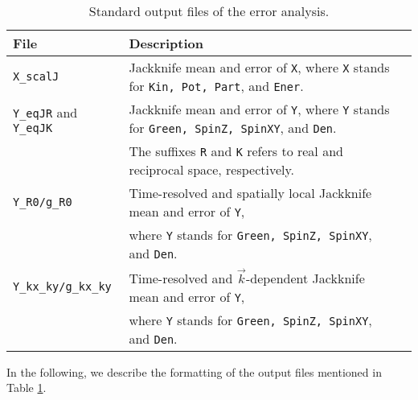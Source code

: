 %
\begin{table}[h]
   \begin{tabular}{@{} l l l @{}}\toprule
   File & Description \\\midrule
   \texttt{X\_scalJ} & Jackknife mean and error of \texttt{X}, where  \texttt{X} stands for \texttt{Kin, Pot, Part}, and \texttt{Ener}.\\
   \texttt{Y\_eqJR} and \texttt{Y\_eqJK} & Jackknife mean and error of \texttt{Y}, where \texttt{Y} stands for \texttt{Green, SpinZ, SpinXY}, and \texttt{Den}.\\
   & The suffixes \texttt{R} and \texttt{K} refers to real and reciprocal space, respectively.\\
   \texttt{Y\_R0/g\_R0} & Time-resolved and spatially local Jackknife mean and error of \texttt{Y},\\
   & where \texttt{Y} stands for \texttt{Green, SpinZ, SpinXY}, and \texttt{Den}.\\
   \texttt{Y\_kx\_ky/g\_kx\_ky} & Time-resolved and $\vec{k}$-dependent Jackknife mean and error of \texttt{Y},\\
   & where \texttt{Y} stands for \texttt{Green, SpinZ, SpinXY}, and \texttt{Den}.\\\bottomrule
    \end{tabular}
   \caption{ Standard output files of the error analysis. \label{table:analysis_output}}
\end{table}
%
In the following, we describe the formatting of the output files mentioned in Table \ref{table:analysis_output}.
